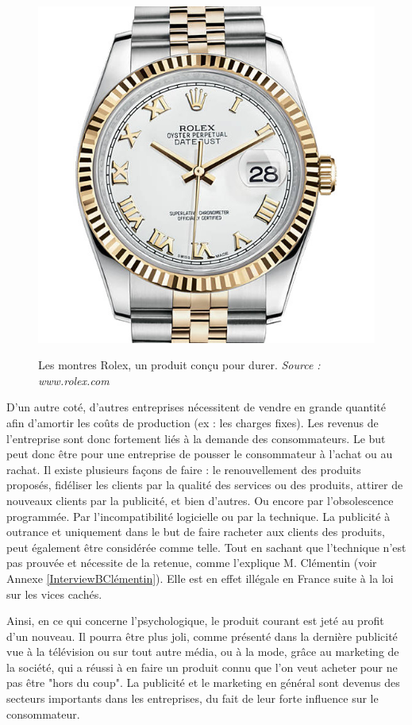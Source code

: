 \begin{figure}
~\includegraphics[scale=0.2]{Rsc/montre_rolex.jpg} 
\caption{Les montres Rolex, un produit conçu pour durer. \textit{Source : www.rolex.com}}
\label{Rolex}
\end{figure} 

\bigbreak
D'un autre coté, d'autres entreprises nécessitent de vendre en grande quantité afin d'amortir les coûts de production (ex : les charges fixes). Les revenus de l'entreprise sont donc fortement liés à la demande des consommateurs. Le but peut donc être pour une entreprise de pousser le consommateur à l'achat ou au rachat. Il existe plusieurs façons de faire :  le renouvellement des produits proposés, fidéliser les clients par la qualité des services ou des produits, attirer de nouveaux clients par la publicité, et bien d'autres. Ou encore par l'obsolescence programmée. Par l'incompatibilité logicielle ou par la technique. La publicité à outrance et uniquement dans le but de faire racheter aux clients des produits, peut également être considérée comme telle. Tout en sachant que l'\op technique n'est pas prouvée et nécessite de la retenue, comme l'explique M. Clémentin (voir Annexe \ref{InterviewBClémentin}). Elle est en effet illégale en France suite à la loi sur les vices cachés.

\bigbreak
Ainsi, en ce qui concerne l'\op psychologique, le produit courant est jeté au profit d'un nouveau. Il pourra être plus joli, comme présenté dans la dernière publicité vue à la télévision ou sur tout autre média, ou à la mode, grâce au marketing de la société, qui a réussi à en faire un produit connu que l'on veut acheter pour ne pas être "hors du coup". La publicité et le marketing en général sont devenus des secteurs importants dans les entreprises, du fait de leur forte influence sur le consommateur.

